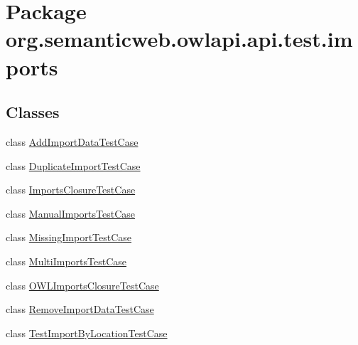 \hypertarget{namespaceorg_1_1semanticweb_1_1owlapi_1_1api_1_1test_1_1imports}{\section{Package org.\-semanticweb.\-owlapi.\-api.\-test.\-imports}
\label{namespaceorg_1_1semanticweb_1_1owlapi_1_1api_1_1test_1_1imports}
}
\subsection*{Classes}
\begin{DoxyCompactItemize}
\item 
class \hyperlink{classorg_1_1semanticweb_1_1owlapi_1_1api_1_1test_1_1imports_1_1_add_import_data_test_case}{Add\-Import\-Data\-Test\-Case}
\item 
class \hyperlink{classorg_1_1semanticweb_1_1owlapi_1_1api_1_1test_1_1imports_1_1_duplicate_import_test_case}{Duplicate\-Import\-Test\-Case}
\item 
class \hyperlink{classorg_1_1semanticweb_1_1owlapi_1_1api_1_1test_1_1imports_1_1_imports_closure_test_case}{Imports\-Closure\-Test\-Case}
\item 
class \hyperlink{classorg_1_1semanticweb_1_1owlapi_1_1api_1_1test_1_1imports_1_1_manual_imports_test_case}{Manual\-Imports\-Test\-Case}
\item 
class \hyperlink{classorg_1_1semanticweb_1_1owlapi_1_1api_1_1test_1_1imports_1_1_missing_import_test_case}{Missing\-Import\-Test\-Case}
\item 
class \hyperlink{classorg_1_1semanticweb_1_1owlapi_1_1api_1_1test_1_1imports_1_1_multi_imports_test_case}{Multi\-Imports\-Test\-Case}
\item 
class \hyperlink{classorg_1_1semanticweb_1_1owlapi_1_1api_1_1test_1_1imports_1_1_o_w_l_imports_closure_test_case}{O\-W\-L\-Imports\-Closure\-Test\-Case}
\item 
class \hyperlink{classorg_1_1semanticweb_1_1owlapi_1_1api_1_1test_1_1imports_1_1_remove_import_data_test_case}{Remove\-Import\-Data\-Test\-Case}
\item 
class \hyperlink{classorg_1_1semanticweb_1_1owlapi_1_1api_1_1test_1_1imports_1_1_test_import_by_location_test_case}{Test\-Import\-By\-Location\-Test\-Case}
\end{DoxyCompactItemize}
